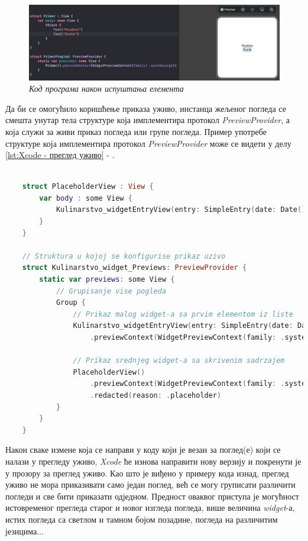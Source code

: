 \documentclass[12pt,oneside]{memoir}
\begin{document}
\begin{figure}[H]
\includegraphics[width=1\textwidth]{images/Drag_and_drop_2.png}
\centering
\caption{\textit{Код програма након испуштања елемента}}
\label{slika:d&d2}
\end{figure}

Да би се омогућило коришћење приказа уживо, инстанца жељеног погледа се смешта унутар тела структуре која имплементира протокол \textit{PreviewProvider}, а која служи за живи приказ погледа или групе погледа. Пример употребе структуре која имплементира протокол \textit{PreviewProvider} може се видети у делу \ref{lst:Xcode - преглед уживо} - .

\begin{lstlisting}[caption=\textit{{Xcode - преглед уживо}}, label={lst:Xcode - преглед уживо}, language=Swift, frame=single]
    
    struct PlaceholderView : View {
        var body : some View {
            Kulinarstvo_widgetEntryView(entry: SimpleEntry(date: Date(), configuration: ConfigurationIntent(), recipe: RecipeModel.testData[0]))
        }
    }
    
    // Struktura u kojoj se konfigurise prikaz uzivo
    struct Kulinarstvo_widget_Previews: PreviewProvider {
        static var previews: some View {
            // Grupisanje vise pogleda
            Group {
                // Prikaz malog widget-a sa prvim elementom iz liste
                Kulinarstvo_widgetEntryView(entry: SimpleEntry(date: Date(), configuration: ConfigurationIntent(), recipe: RecipeModel.testData[0]))
                    .previewContext(WidgetPreviewContext(family: .systemSmall))
                
                // Prikaz srednjeg widget-a sa skrivenim sadrzajem
                PlaceholderView()
                    .previewContext(WidgetPreviewContext(family: .systemMedium))
                    .redacted(reason: .placeholder)
            }
        }
    }    
\end{lstlisting}

\indent Након сваке измене која се направи у коду који је везан за поглед(е) који се налази у прегледу уживо, \textit{Xcode} ће изнова направити нову верзију и покренути је у прозору за преглед уживо. Као што је виђено у примеру кода изнад, преглед уживо не мора приказивати само један поглед, већ се могу груписати различити погледи и све бити приказати одједном. Предност оваквог приступа је могућност истовременог прегледа старог и новог изгледа погледа, више величина \textit{widget}-а, истих погледа са светлом и тамном бојом позадине, погледа на различитим језицима...
\end{document}
